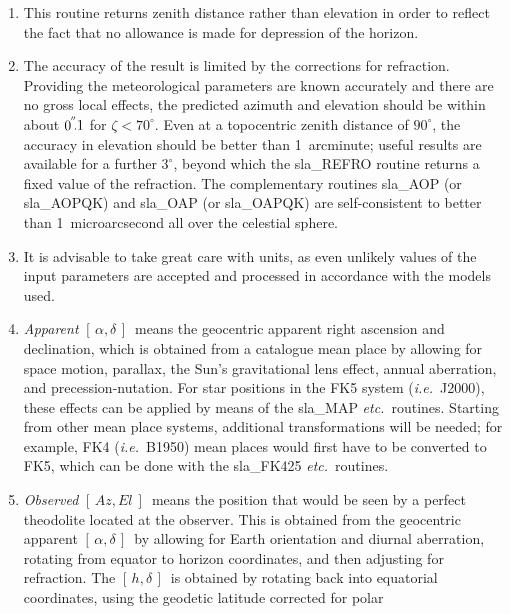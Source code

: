 \documentclass[11pt,twoside]{article}
\newcommand{\radec}     {$[\,\alpha,\delta\,]$}
\newcommand{\hadec}     {$[\,h,\delta\,]$}
\newcommand{\azel}      {$[\,Az,El~]$}
\newcommand{\arcsec}[2] {\arcseci{#1}$\hspace{-0.4em}.#2$}
\newcommand{\arcsec}[2] {
      {$#1\hspace{-0.05em}^{'\hspace{-0.1em}'}\hspace{-0.4em}.#2$}
   }
\newcommand{\arcseci}[1] {$#1\hspace{-0.05em}$\raisebox{-0.5ex}
                         {$^{'\hspace{-0.1em}'}$}}
\renewcommand{\arcseci}[1] {$#1\hspace{-0.05em}^{'\hspace{-0.1em}'}$}
\begin{document}
{
 \begin{enumerate}
  \item This routine returns zenith distance rather than elevation
        in order to reflect the fact that no allowance is made for
        depression of the horizon.
  \item The accuracy of the result is limited by the corrections for
        refraction.  Providing the meteorological parameters are
        known accurately and there are no gross local effects, the
        predicted azimuth and elevation should be within about
        \arcsec{0}{1} for $\zeta<70^{\circ}$.  Even
        at a topocentric zenith distance of
        $90^{\circ}$, the accuracy in elevation should be better than
        1~arcminute;  useful results are available for a further
        $3^{\circ}$, beyond which the sla\_REFRO routine returns a
        fixed value of the refraction.  The complementary
        routines sla\_AOP (or sla\_AOPQK) and sla\_OAP (or sla\_OAPQK)
        are self-consistent to better than 1~microarcsecond all over
        the celestial sphere.
  \item It is advisable to take great care with units, as even
        unlikely values of the input parameters are accepted and
        processed in accordance with the models used.
  \item {\it Apparent}\/ \radec\ means the geocentric apparent
        right ascension
        and declination, which is obtained from a catalogue mean place
        by allowing for space motion, parallax, the Sun's gravitational
        lens effect, annual aberration, and precession-nutation.  For
        star positions in the FK5 system ({\it i.e.}\ J2000), these
        effects can
        be applied by means of the sla\_MAP {\it etc.}\ routines.
        Starting from
        other mean place systems, additional transformations will be
        needed;  for example, FK4 ({\it i.e.}\ B1950) mean places would
        first have to be converted to FK5, which can be done with the
        sla\_FK425 {\it etc.}\ routines.
  \item {\it Observed}\/ \azel\ means the position that would be seen by a
        perfect theodolite located at the observer.  This is obtained
        from the geocentric apparent \radec\ by allowing for Earth
        orientation and diurnal aberration, rotating from equator
        to horizon coordinates, and then adjusting for refraction.
        The \hadec\ is obtained by rotating back into equatorial
        coordinates, using the geodetic latitude corrected for polar

\end{enumerate}}
\end{document}

